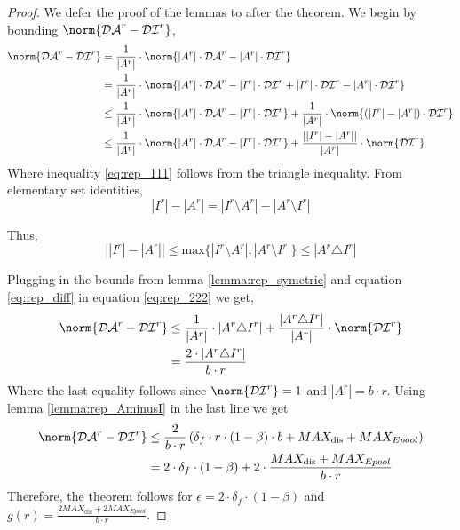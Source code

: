 \begin{proof}
We defer the proof of the lemmas to after the theorem. We begin by bounding $\norm{\mathcal{DA}^r-\mathcal{DI}^{r}}$,
\begin{align}
\norm{\mathcal{DA}^r-\mathcal{DI}^{r}} 
& =\frac{1}{|A^r|} \cdot  \norm{|A^r|\cdot \mathcal{DA}^r-|A^r|\cdot \mathcal{DI}^{r}} \nonumber \\ 
& =\frac{1}{|A^r|} \cdot  \norm{|A^r|\cdot \mathcal{DA}^r-|I^r|\cdot \mathcal{DI}^r+|I^r|\cdot \mathcal{DI}^r-|A^r|\cdot \mathcal{DI}^{r}} \nonumber \\ 
& \leq \frac{1}{|A^r|} \cdot \norm{|A^r|\cdot \mathcal{DA}^r-|I^{r}|\cdot \mathcal{DI}^{r}}+\frac{1}{|A^r|}\cdot \norm{(|I^r|-|A^{r}|)\cdot \mathcal{DI}^{r}} \label{eq:rep_111}\\
& \leq \frac{1}{|A^r|} \cdot \norm{|A^r|\cdot \mathcal{DA}^r-|I^{r}|\cdot \mathcal{DI}^{r}}+\frac{\left ||I^r|-|A^{r}|\right |}{|A^r|}\cdot \norm{\mathcal{DI}^{r}} \label{eq:rep_222}
\end{align}
Where inequality \ref{eq:rep_111} follows from the triangle inequality. 
From elementary set identities, 
\begin{equation}
|I^{r}|-|A^r|=|I^r\setminus A^r|-|A^r\setminus I^r|
\end{equation}

Thus, 
\begin{equation}\label{eq:rep_diff}
\left||I^{r}|-|A^r|\right|\leq \text{max}\{|I^r\setminus A^r|,|A^r\setminus I^r|\}\leq |A^r\triangle I^r|
\end{equation}

Plugging in the bounds from lemma \ref{lemma:rep_symetric} and equation \ref{eq:rep_diff} in equation \ref{eq:rep_222} we get,
\begin{equation}\begin{split} 
\norm{\mathcal{DA}^r-\mathcal{DI}^{r}} 
& \leq \frac{1}{|A^r|} \cdot \left | A^r \triangle I^{r} \right | + \frac{\left | A^r \triangle I^{r} \right |}{|A^r|} \cdot \norm{\mathcal {DI}^{r} }\\
& =\frac{2\cdot | A^r \triangle I^{r}|}{b\cdot r}
\end{split}\end{equation}
Where the last equality follows since $\norm{\mathcal{DI}^r}=1$ and $\left| A^r \right|=b\cdot r$.
Using lemma \ref{lemma:rep_AminusI} in the last line we get
\begin{equation}\begin{split}
\norm{\mathcal{DA}^r-\mathcal{DI}^{r}}
& \leq \frac{2}{b\cdot r} \left(\delta_f\cdot r \cdot (1-\beta)\cdot b+MAX_\text{dis}+ MAX_{Epool}\right)\\
&=2\cdot \delta_f\cdot (1-\beta)+2\cdot \frac{MAX_\text{dis}+ MAX_{Epool}}{b\cdot r}
\end{split}\end{equation}
Therefore, the theorem follows for $\epsilon =2\cdot \delta_f\cdot (1-\beta)$ and $g(r)=\frac{2MAX_\text{dis}+ 2MAX_{Epool}}{b\cdot r}$.
\end{proof}
